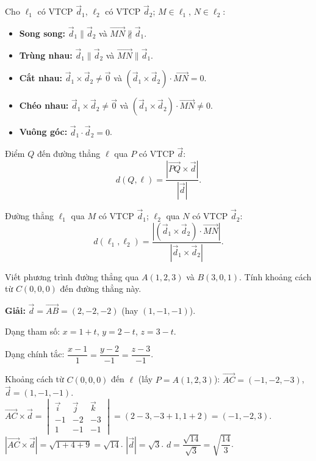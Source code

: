 \documentclass[12pt,a4paper]{article}
\begin{document}
\begin{congthuc}[title={Vị trí tương đối hai đường thẳng}]
  Cho $\ell_1$ có VTCP $\vec{d}_1$, $\ell_2$ có VTCP $\vec{d}_2$; $M \in \ell_1$, $N \in \ell_2$:
  \begin{itemize}
    \item \textbf{Song song:} $\vec{d}_1 \parallel \vec{d}_2$ và $\overrightarrow{MN} \not\parallel \vec{d}_1$.
    \item \textbf{Trùng nhau:} $\vec{d}_1 \parallel \vec{d}_2$ và $\overrightarrow{MN} \parallel \vec{d}_1$.
    \item \textbf{Cắt nhau:} $\vec{d}_1 \times \vec{d}_2 \ne \vec{0}$ và $(\vec{d}_1 \times \vec{d}_2) \cdot \overrightarrow{MN} = 0$.
    \item \textbf{Chéo nhau:} $\vec{d}_1 \times \vec{d}_2 \ne \vec{0}$ và $(\vec{d}_1 \times \vec{d}_2) \cdot \overrightarrow{MN} \ne 0$.
    \item \textbf{Vuông góc:} $\vec{d}_1 \cdot \vec{d}_2 = 0$.
  \end{itemize}
\end{congthuc}

\begin{congthuc}[title={Khoảng cách từ điểm đến đường thẳng}]
  Điểm $Q$ đến đường thẳng $\ell$ qua $P$ có VTCP $\vec{d}$:
  \[
    d(Q, \ell) = \frac{|\overrightarrow{PQ} \times \vec{d}|}{|\vec{d}|}.
  \]
\end{congthuc}

\begin{congthuc}[title={Khoảng cách giữa hai đường thẳng chéo nhau}]
  Đường thẳng $\ell_1$ qua $M$ có VTCP $\vec{d}_1$; $\ell_2$ qua $N$ có VTCP $\vec{d}_2$:
  \[
    d(\ell_1, \ell_2) = \frac{|(\vec{d}_1 \times \vec{d}_2) \cdot \overrightarrow{MN}|}{|\vec{d}_1 \times \vec{d}_2|}.
  \]
\end{congthuc}

\begin{vidu}
  Viết phương trình đường thẳng qua $A(1,2,3)$ và $B(3,0,1)$. Tính khoảng cách từ $C(0,0,0)$ đến đường thẳng này.

  \medskip\textbf{Giải:}
  $\vec{d} = \overrightarrow{AB} = (2,-2,-2)$ (hay $(1,-1,-1)$).

  Dạng tham số: $x = 1+t$, $y = 2-t$, $z = 3-t$.

  Dạng chính tắc: $\dfrac{x-1}{1} = \dfrac{y-2}{-1} = \dfrac{z-3}{-1}$.

  Khoảng cách từ $C(0,0,0)$ đến $\ell$ (lấy $P = A(1,2,3)$):
  $\overrightarrow{AC} = (-1,-2,-3)$, $\vec{d} = (1,-1,-1)$.
  $\overrightarrow{AC}\times\vec{d} = \begin{vmatrix}\vec{i}&\vec{j}&\vec{k}\\-1&-2&-3\\1&-1&-1\end{vmatrix} = (2-3, -3+1, 1+2) = (-1,-2,3)$.
  $|\overrightarrow{AC}\times\vec{d}| = \sqrt{1+4+9} = \sqrt{14}$. $|\vec{d}| = \sqrt{3}$.
  $d = \dfrac{\sqrt{14}}{\sqrt{3}} = \sqrt{\dfrac{14}{3}}$.
\end{vidu}
\end{document}
